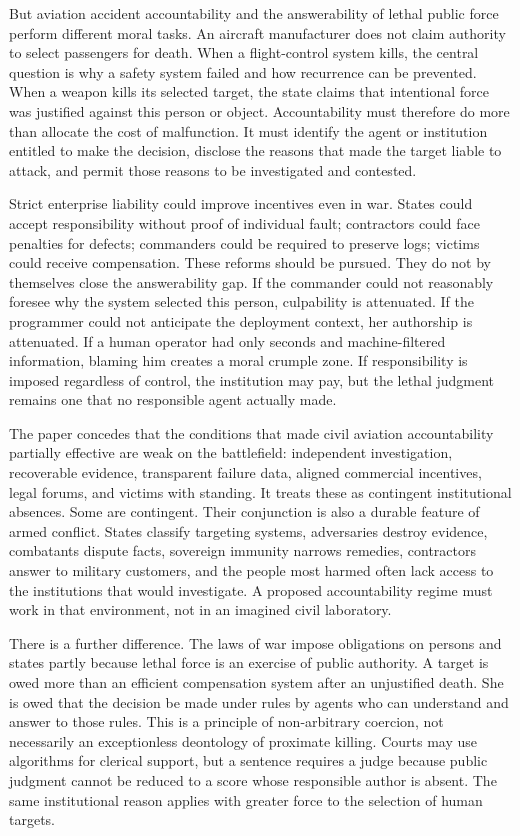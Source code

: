 \documentclass[11pt]{article}
\begin{document}
But aviation accident accountability and the answerability of lethal public force perform different moral tasks. An aircraft manufacturer does not claim authority to select passengers for death. When a flight-control system kills, the central question is why a safety system failed and how recurrence can be prevented. When a weapon kills its selected target, the state claims that intentional force was justified against this person or object. Accountability must therefore do more than allocate the cost of malfunction. It must identify the agent or institution entitled to make the decision, disclose the reasons that made the target liable to attack, and permit those reasons to be investigated and contested.

Strict enterprise liability could improve incentives even in war. States could accept responsibility without proof of individual fault; contractors could face penalties for defects; commanders could be required to preserve logs; victims could receive compensation. These reforms should be pursued. They do not by themselves close the answerability gap. If the commander could not reasonably foresee why the system selected this person, culpability is attenuated. If the programmer could not anticipate the deployment context, her authorship is attenuated. If a human operator had only seconds and machine-filtered information, blaming him creates a moral crumple zone. If responsibility is imposed regardless of control, the institution may pay, but the lethal judgment remains one that no responsible agent actually made.

The paper concedes that the conditions that made civil aviation accountability partially effective are weak on the battlefield: independent investigation, recoverable evidence, transparent failure data, aligned commercial incentives, legal forums, and victims with standing. It treats these as contingent institutional absences. Some are contingent. Their conjunction is also a durable feature of armed conflict. States classify targeting systems, adversaries destroy evidence, combatants dispute facts, sovereign immunity narrows remedies, contractors answer to military customers, and the people most harmed often lack access to the institutions that would investigate. A proposed accountability regime must work in that environment, not in an imagined civil laboratory.

There is a further difference. The laws of war impose obligations on persons and states partly because lethal force is an exercise of public authority. A target is owed more than an efficient compensation system after an unjustified death. She is owed that the decision be made under rules by agents who can understand and answer to those rules. This is a principle of non-arbitrary coercion, not necessarily an exceptionless deontology of proximate killing. Courts may use algorithms for clerical support, but a sentence requires a judge because public judgment cannot be reduced to a score whose responsible author is absent. The same institutional reason applies with greater force to the selection of human targets.
\end{document}
